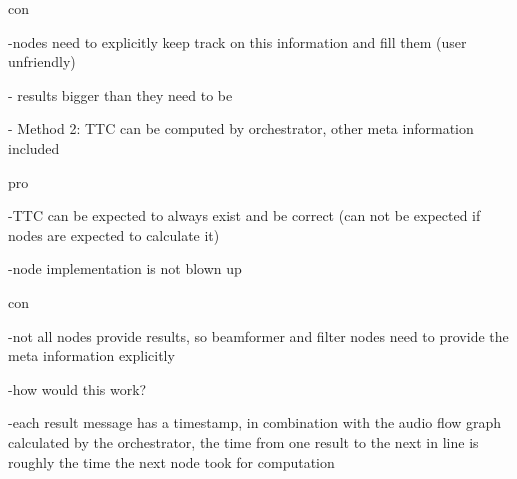 con

-nodes need to explicitly keep track on this information and fill them (user unfriendly)

- results bigger than they need to be

- Method 2: TTC can be computed by orchestrator, other meta information included 

pro

-TTC can be expected to always exist and be correct (can not be expected if nodes are expected to calculate it)

-node implementation is not blown up

con

-not all nodes provide results, so beamformer and filter nodes need to provide the meta information explicitly

-how would this work?

-each result message has a timestamp, in combination with the audio flow graph calculated by the orchestrator, the time from one result to the next in line is roughly the time the next node took for computation
